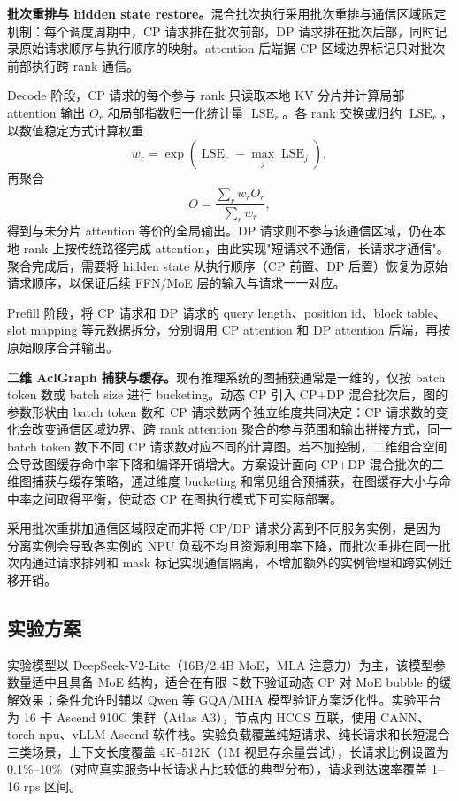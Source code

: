 \textbf{批次重排与 hidden state restore。}混合批次执行采用批次重排与通信区域限定机制：每个调度周期中，CP 请求排在批次前部，DP 请求排在批次后部，同时记录原始请求顺序与执行顺序的映射。attention 后端据 CP 区域边界标记只对批次前部执行跨 rank 通信。

Decode 阶段，CP 请求的每个参与 rank 只读取本地 KV 分片并计算局部 attention 输出 $O_r$ 和局部指数归一化统计量 $\operatorname{LSE}_r$。各 rank 交换或归约 $\operatorname{LSE}_r$，以数值稳定方式计算权重
\[
w_r=\exp(\operatorname{LSE}_r-\max_j \operatorname{LSE}_j),
\]
再聚合
\[
O=\frac{\sum_r w_r O_r}{\sum_r w_r},
\]
得到与未分片 attention 等价的全局输出。DP 请求则不参与该通信区域，仍在本地 rank 上按传统路径完成 attention，由此实现"短请求不通信，长请求才通信"。聚合完成后，需要将 hidden state 从执行顺序（CP 前置、DP 后置）恢复为原始请求顺序，以保证后续 FFN/MoE 层的输入与请求一一对应。

Prefill 阶段，将 CP 请求和 DP 请求的 query length、position id、block table、slot mapping 等元数据拆分，分别调用 CP attention 和 DP attention 后端，再按原始顺序合并输出。

\textbf{二维 AclGraph 捕获与缓存。}现有推理系统的图捕获通常是一维的，仅按 batch token 数或 batch size 进行 bucketing。动态 CP 引入 CP+DP 混合批次后，图的参数形状由 batch token 数和 CP 请求数两个独立维度共同决定：CP 请求数的变化会改变通信区域边界、跨 rank attention 聚合的参与范围和输出拼接方式，同一 batch token 数下不同 CP 请求数对应不同的计算图。若不加控制，二维组合空间会导致图缓存命中率下降和编译开销增大。方案设计面向 CP+DP 混合批次的二维图捕获与缓存策略，通过维度 bucketing 和常见组合预捕获，在图缓存大小与命中率之间取得平衡，使动态 CP 在图执行模式下可实际部署。

采用批次重排加通信区域限定而非将 CP/DP 请求分离到不同服务实例，是因为分离实例会导致各实例的 NPU 负载不均且资源利用率下降，而批次重排在同一批次内通过请求排列和 mask 标记实现通信隔离，不增加额外的实例管理和跨实例迁移开销。

\FloatBarrier

\subsection{实验方案}

实验模型以 DeepSeek-V2-Lite（16B/2.4B MoE，MLA 注意力）为主，该模型参数量适中且具备 MoE 结构，适合在有限卡数下验证动态 CP 对 MoE bubble 的缓解效果；条件允许时辅以 Qwen 等 GQA/MHA 模型验证方案泛化性。实验平台为 16 卡 Ascend 910C 集群（Atlas A3），节点内 HCCS 互联，使用 CANN、torch-npu、vLLM-Ascend 软件栈。实验负载覆盖纯短请求、纯长请求和长短混合三类场景，上下文长度覆盖 4K--512K（1M 视显存余量尝试），长请求比例设置为 0.1\%--10\%（对应真实服务中长请求占比较低的典型分布），请求到达速率覆盖 1--16 rps 区间。

